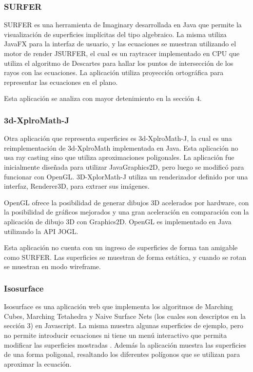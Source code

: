 \documentclass[12pt]{article}
\begin{document}
\subsubsection{SURFER}
SURFER es una herramienta de Imaginary desarrollada en Java que permite la visualización de superficies implícitas del tipo algebraico. La misma utiliza JavaFX para la interfaz de usuario, y las ecuaciones se muestran utilizando el motor de render JSURFER, el cual es un raytracer implementado en CPU que utiliza el algoritmo de Descartes para hallar los puntos de intersección de los rayos con las ecuaciones. La aplicación utiliza proyección ortográfica para representar las ecuaciones en el plano.

Esta aplicación se analiza con mayor detenimiento en la sección 4.
\subsubsection{3d-XplroMath-J}
Otra aplicación que representa superficies es 3d-XplroMath-J, la cual es una reimplementación de 3d-XplroMath implementada en Java. Esta aplicación no usa ray casting sino que utiliza aproximaciones poligonales. La aplicación fue inicialmente diseñada para utilizar JavaGraphics2D, pero luego se modificó para funcionar con OpenGL. 3D-XplorMath-J utiliza un  renderizador definido por una interfaz, Renderer3D, para extraer sus imágenes. 

OpenGL ofrece la posibilidad de generar dibujos 3D acelerados por hardware, con la posibilidad de gráficos mejorados y una gran aceleración en comparación con la aplicación de dibujo 3D con Graphics2D. OpenGL es implementado en Java utilizando la API JOGL.

Esta aplicación no cuenta con un ingreso de superficies de forma tan amigable como SURFER. Las superficies se muestran de forma estática, y cuando se rotan se muestran en modo wireframe.
\subsubsection{Isosurface}
Isosurface es una aplicación web que implementa los algoritmos de Marching Cubes, Marching Tetahedra y Naive Surface Nets (los cuales son descriptos en la sección 3) en Javascript. La misma muestra algunas superficies de ejemplo, pero no permite introducir ecuaciones ni tiene un menú interactivo que permita modificar las superficies mostradas . Además la aplicación muestra las superficies de una forma poligonal, resaltando los diferentes polígonos que se utilizan para aproximar la ecuación.  
\end{document}
